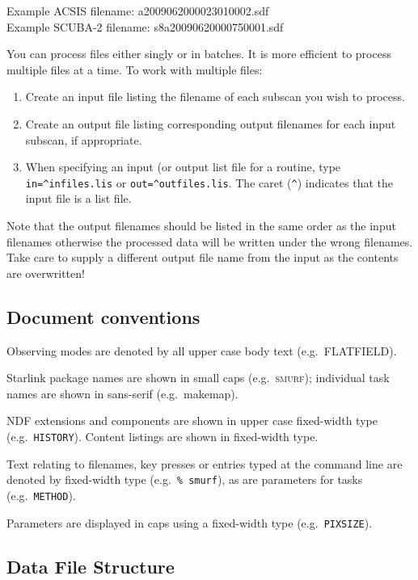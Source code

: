 \documentclass[twoside,11pt]{article}
\newcommand{\xref}[3]{#1}
\renewcommand{\_}{\texttt{\symbol{95}}}
\newcommand{\SMURF}{\textsc{smurf}}
\newcommand{\task}[1]{\textsf{#1}}
\newcommand{\makemap}{\xref{\task{makemap}}{sun258}{MAKEMAP}}
\newcommand{\aparam}[1]{\texttt{#1}}     %
\newcommand{\ndfcomp}[1]{\texttt{#1}}
\begin{document}
Example ACSIS filename: a20090620\_00023\_01\_0002.sdf\\
Example SCUBA-2 filename: s8a20090620\_00075\_0001.sdf

You can process files either singly or in batches. It is more
efficient to process multiple files at a time. To work with multiple
files:
\begin{enumerate}
\item Create an input file listing the filename of each subscan you
  wish to process.
\item Create an output file listing corresponding output filenames for
  each input subscan, if appropriate.
\item When specifying an input (or output list file for a routine,
  type \verb+in=^infiles.lis+ or \verb+out=^outfiles.lis+. The caret
  (\verb+^+) indicates that the input file is a list file.
\end{enumerate}
Note that the output filenames should be listed in the same order as
the input filenames otherwise the processed data will be written under
the wrong filenames. Take care to supply a different output file name
from the input as the contents are overwritten!

\subsection{Document conventions}

Observing modes are denoted by all upper case body text (e.g.\
FLATFIELD).

Starlink package names are shown in small caps (e.g.\ \SMURF);
individual task names are shown in sans-serif (e.g.\ \makemap).

NDF extensions and components are shown in upper case fixed-width type
(e.g.\ \ndfcomp{HISTORY}). Content listings are shown in fixed-width type.

Text relating to filenames, key presses or entries typed at the
command line are denoted by fixed-width type (e.g.\ \texttt{\%
  smurf}), as are parameters for tasks (e.g.\ \aparam{METHOD}).

Parameters are displayed in caps using a fixed-width type (e.g.\
\aparam{PIXSIZE}).


\subsection{Data File Structure}
\end{document}
